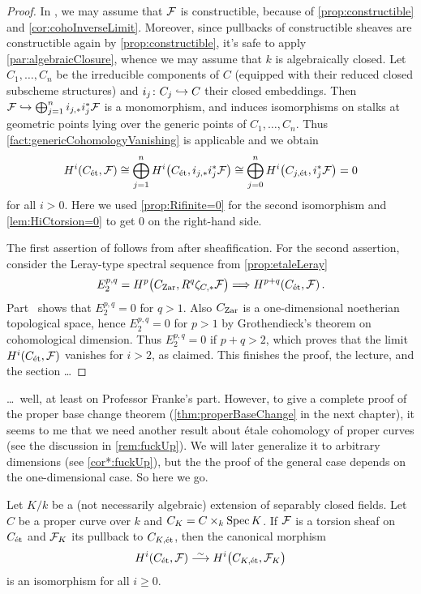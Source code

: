 \begin{proof}
	In , we may assume that $\mathcal{F}$ is constructible, because of \cref{prop:constructible} and \cref{cor:cohoInverseLimit}. Moreover, since pullbacks of constructible sheaves are constructible again by \cref{prop:constructible}, it's safe to apply \cref{par:algebraicClosure}, whence we may assume that $k$ is algebraically closed. Let $C_1,\dotsc,C_n$ be the irreducible components of $C$ (equipped with their reduced closed subscheme structures) and $i_j\colon C_j\monomorphism C$ their closed embeddings. Then $\Ff\monomorphism \bigoplus_{j=1}^ni_{j,*}i_j^*\Ff$ is a monomorphism, and induces isomorphisms on stalks at geometric points lying over the generic points of $C_1,\dotsc,C_n$. Thus \cref{fact:genericCohomologyVanishing} is applicable and we obtain
	\begin{equation*}
		H^i(C_{\mathrm{\acute{e}t}},\mathcal{F})\cong \bigoplus_{j=1}^nH^i\big(C_{\mathrm{\acute{e}t}},i_{j,*}i_j^*\mathcal{F}\big)\cong \bigoplus_{j=0}^nH^i\big(C_{j,\mathrm{\acute{e}t}},i_j^*\mathcal{F}\big)=0
	\end{equation*}
	for all $i>0$. Here we used \cref{prop:Rifinite=0} for the second isomorphism and \cref{lem:HiCtorsion=0} to get $0$ on the right-hand side.
	
	The first assertion of  follows from  after sheafification. For the second assertion, consider the Leray-type spectral sequence from \cref{prop:etaleLeray}
	\begin{equation*}
		E_2^{p,q}=H^p\big(C_\Zar,R^q\zeta_{C,*}\Ff\big)\converge H^{p+q}(C_\et,\Ff)\,.
	\end{equation*}
	Part~ shows that $E_2^{p,q}=0$ for $q>1$. Also $C_{\mathrm{Zar}}$ is a one-dimensional noetherian topological space, hence $E_2^{p,q}=0$ for $p>1$ by Grothendieck's theorem on cohomological dimension. Thus $E_2^{p,q}=0$ if $p+q>2$, which proves that the limit $H^i(C_{\mathrm{\acute{e}t}},\mathcal{F})$ vanishes for $i>2$, as claimed. This finishes the proof, the lecture, and the section \ldots
\end{proof}
\ldots\ well, at least on Professor Franke's part. However, to give a complete proof of the proper base change theorem (\cref{thm:properBaseChange} in the next chapter), it seems to me that we need another result about étale cohomology of proper curves (see the discussion in \cref{rem:fuckUp}). We will later generalize it to arbitrary dimensions (see \cref{cor*:fuckUp}), but the the proof of the general case depends on the one-dimensional case. So here we go.
\begin{prop*}\label{prop:CandCK}
	Let $K/k$ be a (not necessarily algebraic) extension of separably closed fields. Let $C$ be a proper curve over $k$ and $C_K=C\times_k\operatorname{Spec} K$. If $\mathcal{F}$ is a torsion sheaf on $C_{\mathrm{\acute{e}t}}$ and $\mathcal{F}_K$ its pullback to $C_{K,\mathrm{\acute{e}t}}$, then the canonical morphism
	\begin{equation*}
	H^i(C_\et,\Ff)\isomorphism H^i\big(C_{K,\et},\Ff_K\big)
	\end{equation*}
	is an isomorphism for all $i\geq 0$.
\end{prop*}
